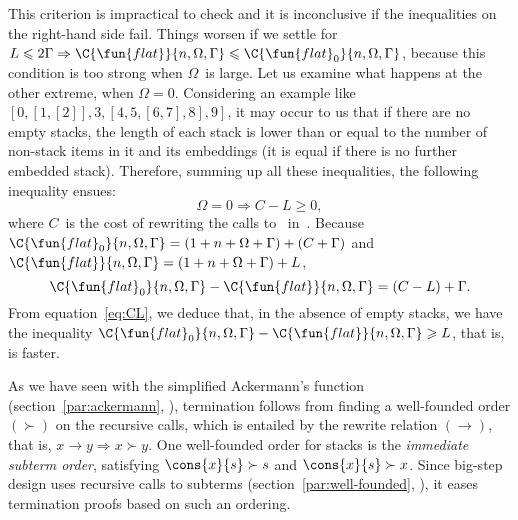  This criterion is impractical to check and
it is inconclusive if the inequalities on the right\hyp{}hand side
fail. Things worsen if we settle for \(L \leqslant 2\Gamma \Rightarrow
\smash[t]{\C{\fun{flat}}{n,\Omega,\Gamma}} \leqslant
\smash[t]{\C{\fun{flat}_0}{n,\Omega,\Gamma}}\), because this condition
is too strong when \(\Omega\)~is large. Let us examine what happens at
the other extreme, when \(\Omega = 0\). Considering an example like
\([0,[1,[2]],3,[4,5,[6,7],8],9]\), it may occur to us that if there
are no empty stacks, the length of each stack is lower than or equal
to the number of non\hyp{}stack items in it and its embeddings (it is
equal if there is no further embedded stack). Therefore, summing up
all these inequalities, the following inequality ensues:
\begin{equation}
  \Omega = 0 \Rightarrow C - L \geqslant 0, \label{eq:CL}
\end{equation}
where \(C\)~is the cost of rewriting the calls
to~
in~. Because
\(\C{\smash{\fun{flat}_0}}{n,\Omega,\Gamma} = (1 + n + \Omega +
\Gamma) + (C + \Gamma)\) and \(\C{\fun{flat}}{n,\Omega,\Gamma} = (1 +
n + \Omega + \Gamma) + L\),
\begin{equation*}
  \C{\smash{\fun{flat}_0}}{n,\Omega,\Gamma} -
  \C{\fun{flat}}{n,\Omega,\Gamma} =
  (C - L) + \Gamma.
\end{equation*}
From equation~\eqref{eq:CL}, we deduce that, in the absence of empty
stacks, we have the inequality
\(\C{\smash{\fun{flat}_0}}{n,\Omega,\Gamma} -
\C{\fun{flat}}{n,\Omega,\Gamma} \geqslant L\), that is,
 is faster.


\label{flattening:termination}

As we have seen with the simplified Ackermann's function
(section~\ref{par:ackermann}, ), termination
follows from finding a well\hyp{}founded order \((\succ)\) on the
recursive calls, which is entailed by the rewrite relation
\((\rightarrow)\), that is, \(x \rightarrow y \Rightarrow x \succ
y\). One well\hyp{}founded order for stacks is the \emph{immediate
  subterm order}, satisfying \(\cons{x}{s} \succ s\) and \(\cons{x}{s}
\succ x\). Since big\hyp{}step design uses recursive calls to subterms
(section~\ref{par:well-founded}, ), it
eases termination proofs based on such an ordering.


